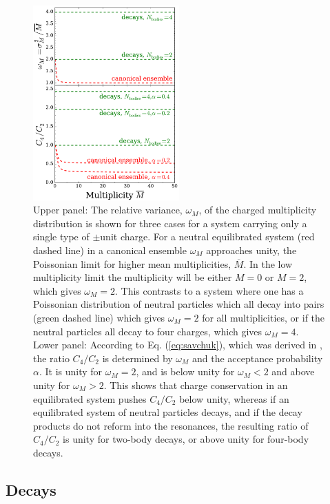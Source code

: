 \begin{figure}
\centerline{\includegraphics[width=0.5\textwidth]{figs/savchuk}}
\caption{\label{fig:savchuk}
Upper panel: The relative variance, $\omega_M$, of the charged multiplicity distribution is shown for three cases for a system carrying only a single type of $\pm$unit charge. For a neutral equilibrated system (red dashed line) in a canonical ensemble $\omega_M$ approaches unity, the Poissonian limit for higher mean multiplicities, $\overline{M}$. In the low multiplicity limit the multiplicity will be either $M=0$ or $M=2$, which gives $\omega_M=2$. This contrasts to a system where one has a Poissonian distribution of neutral particles which all decay into pairs (green dashed line) which gives $\omega_M=2$ for all multiplicities, or if the neutral particles all decay to four charges, which gives $\omega_M=4$.
Lower panel: According to Eq. (\ref{eq:savchuk}), which was derived in \cite{Savchuk:2019xfg}, the ratio $C_4/C_2$ is determined by $\omega_M$ and the acceptance probability $\alpha$. It is unity for $\omega_M=2$, and is below unity for $\omega_M<2$ and above unity for $\omega_M>2$. This shows that charge conservation in an equilibrated system pushes $C_4/C_2$ below unity, whereas if an equilibrated system of neutral particles decays, and if the decay products do not reform into the resonances, the resulting ratio of $C_4/C_2$ is unity for two-body decays, or above unity for four-body decays.}
\end{figure}

\subsection{Decays}\label{sec:decays}

